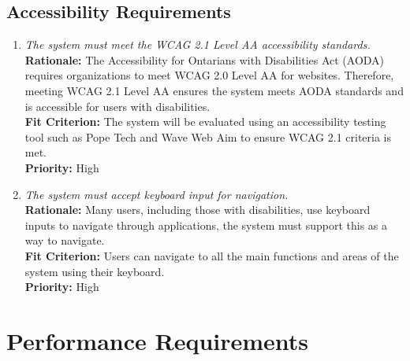 \documentclass[12pt]{article}
\begin{document}
\subsection{Accessibility Requirements}
\begin{enumerate}[label=UHR-AR \arabic*., wide=0pt, leftmargin=*]
\item \emph{The system must meet the WCAG 2.1 Level AA accessibility standards.}\\[2mm] 
    {\bf Rationale:} The Accessibility for Ontarians with Disabilities Act (AODA) requires organizations to meet WCAG 2.0 Level AA for websites. Therefore, meeting WCAG 2.1 Level AA ensures the system meets AODA standards and is accessible for users with disabilities.  \\
    {\bf Fit Criterion:} The system will be evaluated using an accessibility testing tool such as Pope Tech and Wave Web Aim to ensure WCAG 2.1 criteria is met.\\
    {\bf Priority:} High
\item \emph{The system must accept keyboard input for navigation.}\\[2mm] 
    {\bf Rationale:} Many users, including those with disabilities, use keyboard inputs to navigate through applications, the system must support this as a way to navigate.\\
    {\bf Fit Criterion:} Users can navigate to all the main functions and areas of the system using their keyboard. \\
    {\bf Priority:} High
\end{enumerate}


\section{Performance Requirements}
\end{document}
